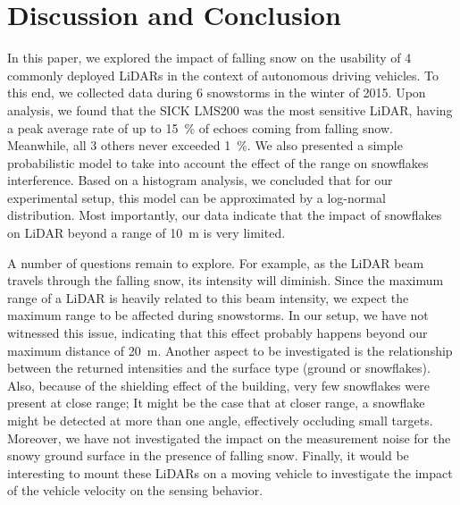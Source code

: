 \section{Discussion and Conclusion}

In this paper, we explored the impact of falling snow on the usability of 4 commonly deployed LiDARs in the context of autonomous driving vehicles. To this end, we collected data during 6 snowstorms in the winter of 2015. Upon analysis, we found that the SICK LMS200 was the most sensitive LiDAR, having a peak average rate of up to 15~\% of echoes coming from falling snow. Meanwhile, all 3 others never exceeded 1~\%. We also presented a simple probabilistic model to take into account the effect of the range on snowflakes interference. Based on a histogram analysis, we concluded that for our experimental setup, this model can be approximated by a log-normal distribution. Most importantly, our data indicate that the impact of snowflakes on LiDAR beyond a range of \SI{10}{\meter} is very limited. 


A number of questions remain to explore. For example, as the LiDAR beam travels through the falling snow, its intensity will diminish. Since the maximum range of a LiDAR is heavily related to this beam intensity, we expect the maximum range to be affected during snowstorms. In our setup, we have not witnessed this issue, indicating that this effect probably happens beyond our maximum distance of \SI{20}{\meter}. Another aspect to be investigated is the relationship between the returned intensities and the surface type (ground or snowflakes). Also, because of the shielding effect of the building, very few snowflakes were present at close range; It might be the case that at closer range, a snowflake might be detected at more than one angle, effectively occluding small targets. Moreover, we have not investigated the impact on the measurement noise for the snowy ground surface in the presence of falling snow. Finally, it would be interesting to mount these LiDARs on a moving vehicle to investigate the impact of the vehicle velocity on the sensing behavior.



